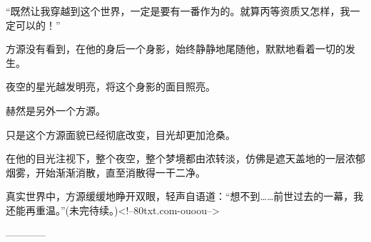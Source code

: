 \begin{this_body}
“既然让我穿越到这个世界，一定是要有一番作为的。就算丙等资质又怎样，我一定可以的！”

方源没有看到，在他的身后一个身影，始终静静地尾随他，默默地看着一切的发生。

夜空的星光越发明亮，将这个身影的面目照亮。

赫然是另外一个方源。

只是这个方源面貌已经彻底改变，目光却更加沧桑。

在他的目光注视下，整个夜空，整个梦境都由浓转淡，仿佛是遮天盖地的一层浓郁烟雾，开始渐渐消散，直至消散得一干二净。

真实世界中，方源缓缓地睁开双眼，轻声自语道：“想不到……前世过去的一幕，我还能再重温。”(未完待续。)<!--80txt.com-ouoou-->

------------

\end{this_body}

